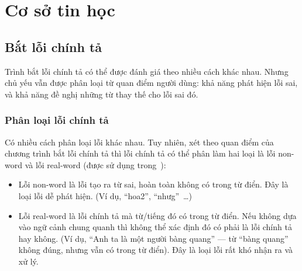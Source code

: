 \documentclass[a4paper,oneside,14pt]{extbook} %
\begin{document}

\chapter{Cơ sở tin học}
\label{cha:math}
\minitoc



\section{Bắt lỗi chính tả}

Trình bắt lỗi chính tả có thể được đánh giá theo nhiều cách khác
nhau. Nhưng chủ yếu vẫn được phân loại từ quan điểm người dùng: khả
năng phát hiện lỗi sai, và khả năng đề nghị những từ thay thế cho lỗi
sai đó.

\subsection{Phân loại lỗi chính tả}

Có nhiều cách phân loại lỗi khác nhau. Tuy nhiên, xét theo quan điểm của
chương trình bắt lỗi chính tả thì lỗi chính tả có thể phân làm hai
loại là lỗi non-word và lỗi real-word (được sử dụng trong~\cite{Tuoi}):
\begin{itemize}
\item Lỗi non-word là lỗi tạo ra từ sai, hoàn toàn không có trong từ
  điển. Đây là loại lỗi dễ phát hiện. (Ví dụ, ``hoa2'',
  ``nhưg''~\ldots)
\item Lỗi real-word là lỗi chính tả mà từ/tiếng đó có trong từ điển. Nếu
  không dựa vào ngữ cảnh chung quanh thì không thể xác định đó có phải
  là lỗi chính tả hay không. (Ví dụ, ``Anh ta là một người bàng
  quang'' --- từ ``bàng quang'' không đúng, nhưng vẫn có trong từ
  điển). Đây là loại lỗi rất khó nhận ra và xử lý.
\end{itemize}
\end{document}
